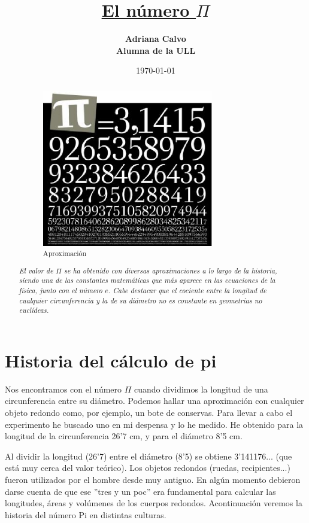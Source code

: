 \documentclass[spanish,11pt,a4paper]{article}
\title{\Huge\bf{\underline{El número $\Pi$}}}
\author{\Large\bf Adriana Calvo\\ Alumna de la ULL\\}
\date{\today}
\begin{document}
\maketitle

\begin{abstract}
\begin{figure}[h]
\begin{center}
\includegraphics[width=0.75\textwidth]{images/foto1.eps}\end{center}
\caption{Aproximación}
\end{figure}

{\it\large El valor de $\Pi$ se ha obtenido con diversas aproximaciones a lo largo de la historia, siendo una de las constantes matemáticas que más aparece en las ecuaciones de la física, junto con el número $e$. Cabe destacar que el cociente entre la longitud de cualquier circunferencia y la de su diámetro no es constante en geometrías no euclídeas.}
\end{abstract} 

\section{Historia del cálculo de pi}
Nos encontramos con el número $\Pi$ cuando dividimos la longitud de una circunferencia entre su diámetro. Podemos hallar una aproximación con cualquier objeto redondo como, por ejemplo, un bote de conservas. Para llevar a cabo el experimento he buscado uno en mi despensa y lo he medido. He obtenido para la longitud de la circunferencia 26'7 cm, y para el diámetro 8'5 cm. 

Al dividir la longitud (26'7) entre el diámetro (8'5) se obtiene 3'141176... (que está muy cerca del valor teórico). Los objetos redondos (ruedas, recipientes...) fueron utilizados por el hombre desde muy antiguo. En algún momento debieron darse cuenta de que ese ''tres y un poc'' era fundamental para calcular las longitudes, áreas y volúmenes de los cuerpos redondos. 
Acontinuación veremos la historia del número Pi en distintas culturas.
\end{document}
